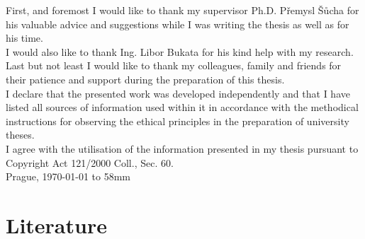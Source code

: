 \documentclass[11pt,twoside,a4paper]{book}
\author{Jan Dryk}
\begin{document}

\cleardoublepage

\maketitle
\cleardoublepage

{%
	First, and foremost I would like to thank my supervisor Ph.D. Přemysl Šůcha for his
    valuable advice and suggestions while I was writing the thesis as well as for his time.\\
    
    I would also like to thank Ing. Libor Bukata for his kind help with my research.\\
    
    Last but not least I would like to thank my colleagues, family and friends for their patience
    and support during the preparation of this thesis. \\
}
{%
    I declare that the presented work was developed independently and that I have listed
    all sources of information used within it in accordance with the methodical instructions for
    observing the ethical principles in the preparation of university theses. \\
    
    I agree with the utilisation of the information presented in my thesis pursuant to
    Copyright Act 121/2000 Coll., Sec. 60. 
\\[90mm]
	Prague, \today \vspace{10mm} \hfill \hbox to 58mm{\tiny\dotfill}
}

\cleardoublepage


{
    
}
{
    
}

\setcounter{page}{1}

\tableofcontents









 


\section{Literature}

\printbibliography
\appendix





\end{document}
